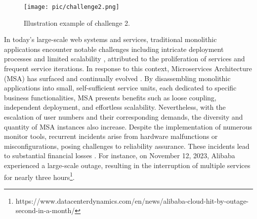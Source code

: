 % 
\begin{figure*}[htbp]
\centerline{\texttt{[image: pic/challenge2.png]}}
\caption{Illustration example of challenge 2.}
\label{challenge2}
\end{figure*}

In today's large-scale web systems and services, traditional monolithic applications encounter notable challenges including intricate deployment processes and limited scalability \cite{micro1,micro2,micro3,micro4,micro5}, attributed to the proliferation of services and frequent service iterations. In response to this context, Microservices Architecture (MSA) has surfaced and continually evolved \citep{chen2024microfi}. By disassembling monolithic applications into small, self-sufficient service units, each dedicated to specific business functionalities, MSA presents benefits such as loose coupling, independent deployment, and effortless scalability. Nevertheless, with the escalation of user numbers and their corresponding demands, the diversity and quantity of MSA instances also increase. Despite the implementation of numerous monitor tools, recurrent incidents arise from hardware malfunctions or misconfigurations, posing challenges to reliability assurance. These incidents lead to substantial financial losses \cite{wang2024large}. For instance, on November 12, 2023, Alibaba experienced a large-scale outage, resulting in the interruption of multiple services for nearly three hours\footnote{https://www.datacenterdynamics.com/en/news/alibaba-cloud-hit-by-outage-second-in-a-month/}.

